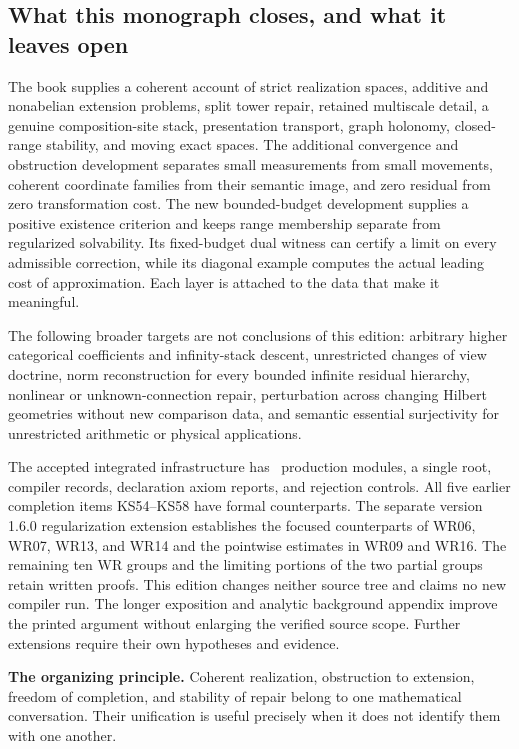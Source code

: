 \subsection{What this monograph closes, and what it leaves open}
The book supplies a coherent account of strict realization spaces, additive and nonabelian extension problems, split tower repair, retained multiscale detail, a genuine composition-site stack, presentation transport, graph holonomy, closed-range stability, and moving exact spaces. The additional convergence and obstruction development separates small measurements from small movements, coherent coordinate families from their semantic image, and zero residual from zero transformation cost. The new bounded-budget development supplies a positive existence criterion and keeps range membership separate from regularized solvability. Its fixed-budget dual witness can certify a limit on every admissible correction, while its diagonal example computes the actual leading cost of approximation. Each layer is attached to the data that make it meaningful.

The following broader targets are not conclusions of this edition: arbitrary higher categorical coefficients and infinity-stack descent, unrestricted changes of view doctrine, norm reconstruction for every bounded infinite residual hierarchy, nonlinear or unknown-connection repair, perturbation across changing Hilbert geometries without new comparison data, and semantic essential surjectivity for unrestricted arithmetic or physical applications.

The accepted integrated infrastructure has \EditionFormalModules\ production modules, a single root, compiler records, declaration axiom reports, and rejection controls. All five earlier completion items KS54--KS58 have formal counterparts. The separate version 1.6.0 regularization extension establishes the focused counterparts of WR06, WR07, WR13, and WR14 and the pointwise estimates in WR09 and WR16. The remaining ten WR groups and the limiting portions of the two partial groups retain written proofs. This edition changes neither source tree and claims no new compiler run. The longer exposition and analytic background appendix improve the printed argument without enlarging the verified source scope. Further extensions require their own hypotheses and evidence.

\begin{insight}
\textbf{The organizing principle.} Coherent realization, obstruction to extension, freedom of completion, and stability of repair belong to one mathematical conversation. Their unification is useful precisely when it does not identify them with one another.
\end{insight}
